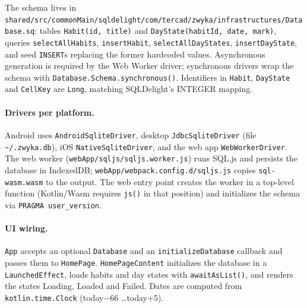 \noindent The schema lives in
\texttt{shared/src/commonMain/sqldelight/com/tercad/zwyka/infrastructures/Database.sq}:
tables \texttt{Habit(id, title)} and \texttt{DayState(habitId, date, mark)}, queries
\texttt{selectAllHabits}, \texttt{insertHabit}, \texttt{selectAllDayStates},
\texttt{insertDayState}, and seed \texttt{INSERT}s replacing the former hardcoded values.
Asynchronous generation is required by the Web Worker driver; synchronous drivers wrap the
schema with \texttt{Database.Schema.synchronous()}. Identifiers in \texttt{Habit},
\texttt{DayState} and \texttt{CellKey} are \texttt{Long}, matching SQLDelight's INTEGER mapping.

\paragraph{Drivers per platform.}
Android uses \texttt{AndroidSqliteDriver}, desktop \texttt{JdbcSqliteDriver} (file
\texttt{\textasciitilde/.zwyka.db}), iOS \texttt{NativeSqliteDriver}, and the web app
\texttt{WebWorkerDriver}. The web worker (\texttt{webApp/sqljs/sqljs.worker.js}) runs SQL.js
and persists the database in IndexedDB; \texttt{webApp/webpack.config.d/sqljs.js} copies
\texttt{sql-wasm.wasm} to the output. The web entry point creates the worker in a top-level
function (Kotlin/Wasm requires \texttt{js()} in that position) and initializes the schema via
\texttt{PRAGMA user_version}.

\paragraph{UI wiring.}
\texttt{App} accepts an optional \texttt{Database} and an \texttt{initializeDatabase} callback
and passes them to \texttt{HomePage}. \texttt{HomePageContent} initializes the database in a
\texttt{LaunchedEffect}, loads habits and day states with \texttt{awaitAsList()}, and renders
the states Loading, Loaded and Failed. Dates are computed from \texttt{kotlin.time.Clock}
(today$-66$ \ldots today$+5$).
